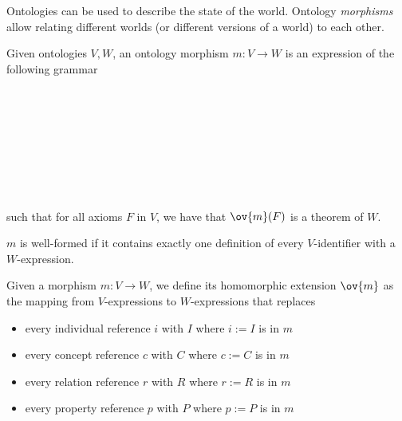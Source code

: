 Ontologies can be used to describe the state of the world.
Ontology \emph{morphisms} allow relating different worlds (or different versions of a world) to each other.

\begin{definition}
Given ontologies $V,W$, an ontology morphism $m:V\to W$ is an expression of the following grammar
\begin{commgrammar}
\\
\\
\\
\\
\\
\\
\\
\end{commgrammar}
such that for all axioms $F$ in $V$, we have that $\ov{m}(F)$ is a theorem of $W$.

$m$ is well-formed if it contains exactly one definition of every $V$-identifier with a $W$-expression.
\end{definition}

\begin{definition}
Given a morphism $m:V\to W$, we define its homomorphic extension $\ov{m}$ as the mapping from $V$-expressions to $W$-expressions that replaces
\begin{itemize}
\item every individual reference $i$ with $I$ where $i:=I$ is in $m$
\item every concept reference $c$ with $C$ where $c:=C$ is in $m$
\item every relation reference $r$ with $R$ where $r:=R$ is in $m$
\item every property reference $p$ with $P$ where $p:=P$ is in $m$
\end{itemize}
\end{definition}

